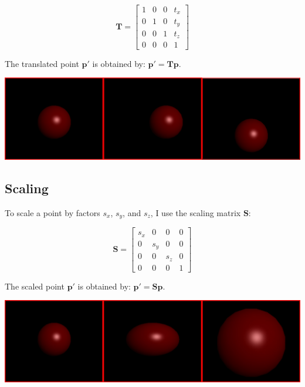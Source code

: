 \documentclass{article}
\begin{document}
	
	\[
	\bm{T} = \begin{bmatrix}
		1 & 0 & 0 & t_x \\
		0 & 1 & 0 & t_y \\
		0 & 0 & 1 & t_z \\
		0 & 0 & 0 & 1
	\end{bmatrix}
	\]
	
	
	The translated point \(\bm{p}'\) is obtained by: \(\bm{p}' = \bm{T} \bm{p}\).
	

	\begin{center} \includegraphics[width=1\textwidth]{homogenious_notation_images/position.jpg}  \end{center}
	
	\subsection{Scaling}
	To scale a point by factors \(s_x\), \(s_y\), and \(s_z\), I use the scaling matrix \(\bm{S}\):
	
	
	\[
	\bm{S} = \begin{bmatrix}
		s_x & 0 & 0 & 0 \\
		0 & s_y & 0 & 0 \\
		0 & 0 & s_z & 0 \\
		0 & 0 & 0 & 1
	\end{bmatrix}
	\]
	
	
	The scaled point \(\bm{p}'\) is obtained by: \(\bm{p}' = \bm{S} \bm{p}\).
	
\begin{center} \includegraphics[width=1\textwidth]{homogenious_notation_images/scale.jpg}  \end{center}
\end{document}
